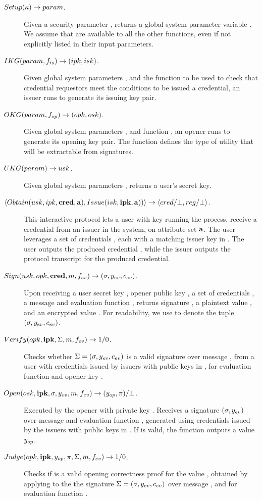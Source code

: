 \begin{description}
\item[$Setup(\kappa) \rightarrow param$.] Given a security parameter \secpar,
  returns a global system parameter variable \parm. We assume that \parm are
  available to all the other functions, even if not explicitly listed in their
  input parameters.
\item[$IKG(param,f_{is}) \rightarrow (ipk,isk)$.] Given global system
  parameters \parm, and the function \fissue to be used to check that credential
  requestors meet the conditions to be issued a credential, an issuer runs
  \IKeyGen to generate its issuing key pair. 
\item[$OKG(param,f_{op}) \rightarrow (opk,osk)$.] Given global system
  parameters \parm, and function \finsp, an opener runs \OKeyGen to generate
  its opening key pair. The function \finsp defines the type of utility that
  will be extractable from signatures.
\item[$UKG(param) \rightarrow usk$.] Given global system parameters
  \parm, returns a user's secret key.
\item[$\langle
  Obtain(usk,ipk,\mathbf{cred},\mathbf{a}),
  Issue(isk,\mathbf{ipk},\mathbf{a}))
  \rangle \rightarrow \langle cred/\bot,reg/\bot \rangle$.] %
  This interactive protocol lets a user with key \usk running the
  \Obtain process, receive a credential \cred from an issuer in the system, on
  attribute set $\mathbf{a}$. The user leverages a set of credentials \scred,
  each with a matching issuer key in \sipk.
  The user outputs the produced credential \cred, while
  the issuer outputs the protocol transcript \utrans for the produced
  credential.
\item[$Sign(usk,opk,\mathbf{cred},m,f_{ev}) \rightarrow (\sigma,y_{ev},c_{ev})$.] %
  Upon receiving a user secret key \usk, opener public key \opk, a set of
  credentials \scred, a message \msg and evaluation
  function \feval, returns signature \sig, a plaintext value \yeval,
  and an encrypted value \ceval. For readability, we use \Sig to denote
  the tuple $(\sigma,y_{ev},c_{ev})$.
\item[$Verify(opk, \mathbf{ipk},\Sigma,m,f_{ev}) \rightarrow 1/0$.]
  Checks whether $\Sigma = (\sigma,y_{ev},c_{ev})$ is a valid signature
  over message \msg, from a user with credentials issued by issuers with public
  keys in \sipk, for evaluation function \feval and opener key \opk.
\item[$Open(osk,\mathbf{ipk},\sigma,y_{ev},m,f_{ev}) \rightarrow
  (y_{op},\pi)/\bot$.]
  Executed by the opener with private key \osk. Receives a signature $(\sigma,
  y_{ev})$ over message \msg and evaluation function \feval, generated using
  credentials issued by the issuers with public keys in \sipk. If \sig is valid,
  the function outputs a value $y_{op}$.
\item[$Judge(opk,\mathbf{ipk},y_{op},\pi,\Sigma,m,f_{ev}) \rightarrow 1/0$.] %
  Checks if \iproof is a valid opening correctness proof for the value \yinsp,
  obtained by applying \Open to the the signature $\Sigma = (\sigma,y_{ev},c_{ev})$
  over message \msg, and for evaluation function \feval. 
\end{description}

